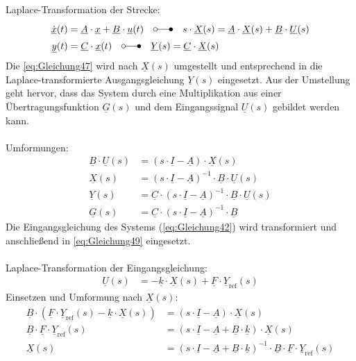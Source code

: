 \clearpage

Laplace-Transformation der Strecke:
\begin{align}
    \underline{\dot{x}}(t) &= \underline{A}\cdot\underline{x}+\underline{B}\cdot\underline{u}(t)\quad\laplace\quad s\cdot \underline{X}(s) = \underline{A}\cdot\underline{X}(s)+\underline{B}\cdot\underline{U}(s) \label{eq:Gleichung47}\\
    \underline{y}(t) &= \underline{C}\cdot\underline{x}(t) \quad\laplace\quad \underline{Y}(s) = \underline{C}\cdot\underline{X}(s) \label{eq:Gleichung48}
\end{align}
\newline
Die \autoref{eq:Gleichung47} wird nach $\underline{X}(s)$ umgestellt und entsprechend in die Laplace-transformierte Ausgangsgleichung $\underline{Y}(s)$ eingesetzt. Aus der Umstellung geht hervor, dass das System durch eine Multiplikation aus einer Übertragungsfunktion $\underline{G}(s)$ und dem Eingangssignal $\underline{U}(s)$ gebildet werden kann.\\\\
Umformungen:
\begin{align}
    \underline{B}\cdot\underline{U}(s) &= (s\cdot\underline{I}-\underline{A})\cdot\underline{X}(s) \label{eq:Gleichung49}\\
    \underline{X}(s) &= (s\cdot\underline{I}-\underline{A})^{-1}\cdot\underline{B}\cdot\underline{U}(s) \nonumber \\
    \underline{Y}(s) &= \underline{C}\cdot(s\cdot\underline{I}-\underline{A})^{-1}\cdot\underline{B}\cdot\underline{U}(s) \label{eq:Gleichung50}\\
    \underline{G}(s) &= \underline{C}\cdot(s\cdot\underline{I}-\underline{A})^{-1}\cdot\underline{B} \nonumber
\end{align}
\newline
Die Eingangsgleichung des Systems (\autoref{eq:Gleichung42}) wird transformiert und anschließend in \autoref{eq:Gleichung49} eingesetzt.\\\\
Laplace-Transformation der Eingangsgleichung:
\begin{align*}
    \underline{U}(s) &= -\underline{k}\cdot\underline{X}(s)+\underline{F}\cdot\underline{Y}_{\mathrm{ref}}(s)
\end{align*}
\newline
Einsetzen und Umformung nach $\underline{X}(s)$:
\begin{align}
    \underline{B}\cdot(\underline{F}\cdot\underline{Y}_{\mathrm{ref}}(s)-\underline{k}\cdot\underline{X}(s)) &= (s\cdot\underline{I}-\underline{A})\cdot\underline{X}(s) \nonumber \\
    \underline{B}\cdot \underline{F}\cdot\underline{Y}_{\mathrm{ref}}(s) &= (s\cdot\underline{I}-\underline{A}+\underline{B}\cdot{\underline{k}})\cdot\underline{X}(s) \nonumber \\
    \underline{X}(s) &= (s\cdot\underline{I}-\underline{A}+\underline{B}\cdot{\underline{k}})^{-1}\cdot\underline{B}\cdot \underline{F}\cdot\underline{Y}_{\mathrm{ref}}(s) \label{eq:Gleichung51}
\end{align}
